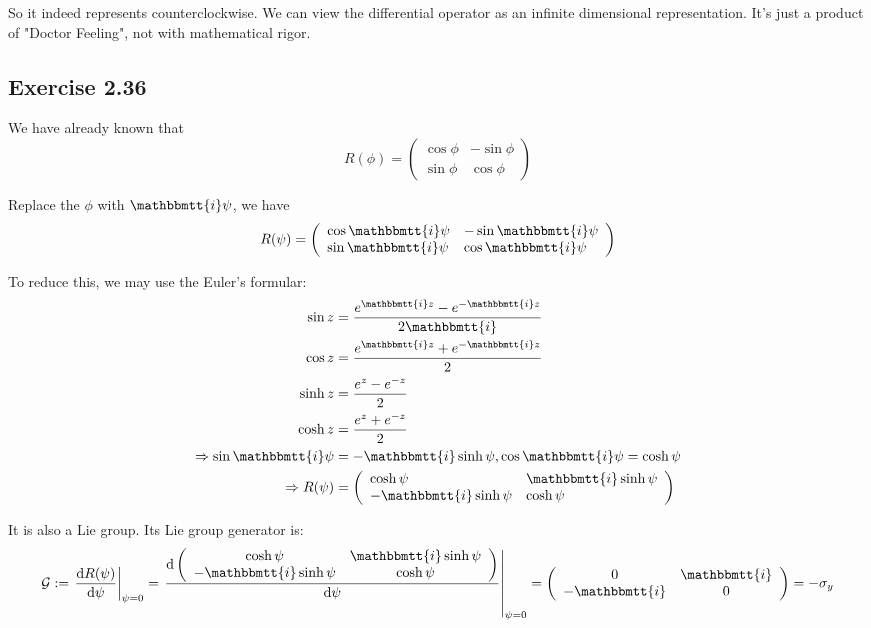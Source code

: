 \documentclass[]{ctexart}
\newcommand{\mi}{\mathbbmtt{i}}
\begin{document}
		So it indeed represents  counterclockwise. We can view the differential operator as an infinite dimensional representation. It's just a product of "Doctor Feeling", not with mathematical rigor. 
		
	\subsection{Exercise 2.36}
		We have already known that 
			\begin{equation*}
			 R(\phi)=
			 \left(\begin{array}{ll}
			 \cos \phi & -\sin \phi \\
			 \sin \phi & \cos \phi
			 \end{array}\right)
			\end{equation*}
		
		Replace the $\phi$ with $\mi \psi$, we have 
			\begin{equation*}
			R(\psi)=
			\left(\begin{array}{ll}
			\cos \mi \psi & -\sin \mi \psi \\
			\sin \mi \psi & \cos \mi \psi
			\end{array}\right)
			\end{equation*}
		
		To reduce this, we may use the Euler's formular:
			\begin{equation*}
				\begin{aligned}
				\sin z&=\frac{e^{\mi z}-e^{-\mi z}}{2\mi }\\
				\cos z&=\frac{e^{\mi z}+e^{-\mi z}}{2}\\
				\sinh z&=\frac{e^{z}-e^{-z}}{2}\\
				\cosh z&=\frac{e^{z}+e^{-z}}{2}\\
				\Rightarrow \sin \mi \psi &=-\mi \sinh \psi ,\cos \mi \psi =\cosh \psi\\
				\Rightarrow R(\psi)&=
				\left(\begin{array}{ll}
				\cosh \psi & \mi \sinh \psi \\
				-\mi \sinh \psi & \cosh \psi
				\end{array}\right)
				\end{aligned}
			\end{equation*}
		
		It is also a Lie group. Its Lie group generator is:
			\begin{equation*}
				\mathcal{G}:=\left.\frac{\mathrm{d} R(\psi)}{\mathrm{d} \psi}\right|_{\psi=0}=\left.\frac{\mathrm{d}\left(\begin{array}{cc}
					\cosh \psi & \mi \sinh \psi \\
					-\mi \sinh \psi & \cosh \psi
					\end{array}\right)}{\mathrm{d} \psi}\right|_{\psi=0}=\left(\begin{array}{cc}
				0 & \mi \\
				-\mi & 0
				\end{array}\right)=-\sigma_y
			\end{equation*}
			
\end{document}
